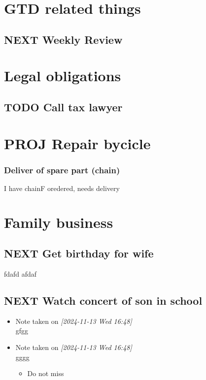 \documentclass[11pt]{article}
\author{Ugo}
\date{\today}
\title{}
\begin{document}
\tableofcontents


\section{GTD related things}
\label{sec:org4deb922}
\subsection{{\bfseries\sffamily NEXT} Weekly Review}
\label{sec:org48ddd20}

\section{Legal obligations}
\label{sec:org6626af2}
\subsection{{\bfseries\sffamily TODO} Call tax lawyer}
\label{sec:org5452ce7}

\section{{\bfseries\sffamily PROJ} Repair bycicle}
\label{sec:org9fbf376}
\subsubsection{Deliver of spare part (chain)}
\label{sec:orge9af56e}
I have chainF oredered, needs delivery

\section{Family business}
\label{sec:org450aa13}
\subsection{{\bfseries\sffamily NEXT} Get birthday for wife}
\label{sec:org6eb6e6e}
fdafd
afdaf
\subsection{{\bfseries\sffamily NEXT} Watch concert of son in school}
\label{sec:org5ee7b7f}
\begin{itemize}
\item Note taken on \textit{[2024-11-13 Wed 16:48] } \\[0pt]
gfgg
\item Note taken on \textit{[2024-11-13 Wed 16:48] } \\[0pt]
gggg
\begin{itemize}
\item Do not miss
\end{itemize}
\end{itemize}
\end{document}
